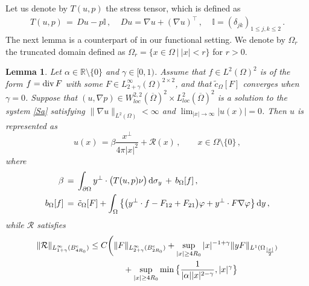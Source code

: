 \documentclass[11pt,a4paper]{article}
\newtheorem{lemma}[theorem]{Lemma}
\newcommand{\R}{\mathbb{R}}
\newcommand{\dd}{\,{\rm d}}
\begin{document}
Let us denote by $T(u,p)$ the stress tensor, which is defined as 
%
\begin{align}
T(u,p) \, = \, D u - p \mathbb{I}\,,~~~~~ D u = \nabla u + (\nabla u )^\top\,,~~~~~\mathbb{I} = (\delta_{j k})_{1\leq j,k\leq 2}\,.
\end{align}
%
The next lemma is a counterpart of \cite[Theorem 2.1]{H3} in our functional setting.
We denote by $\Omega_r$ the truncated domain defined as $\Omega_r = \{x\in \Omega~|~|x|<r\}$ for $r>0$. 



\begin{lemma}\label{lem.linear.exterior}
Let $\alpha \in \R \setminus \{0\}$ and $\gamma \in [0,1)$. Assume that  $f\in L^2 (\Omega)^2$ is of the form $f = {\rm div}\,F$ with some $F\in L^\infty_{2+\gamma} (\Omega)^{2\times 2}$, and that $\tilde c_\Omega [F]$ converges when $\gamma=0$.
Suppose that $(u, \nabla p)\in W^{2,2}_{loc} (\overline{\Omega})^2 \times L^2_{loc} (\overline{\Omega})^2$ is a solution to the system \eqref{Sa} satisfying  $\| \nabla u \|_{L^2 (\Omega)}<\infty$ and $\displaystyle \lim_{|x|\rightarrow \infty} |u (x)|=0$.
Then $u$ is represented as 
%
\begin{equation}\label{est.lem.linear.exterior.1}
u(x) \, = \beta \frac{x^{\bot}}{4\pi|x|^2} + \mathcal{R}(x)\,,  \qquad x\in \Omega\setminus \{0\}\,,
\end{equation}
%
where  
%
\begin{align}\label{est.lem.linear.exterior.3}
\begin{split}
\beta & \, = \,  \int_{\partial \Omega} y^\bot \cdot \big( T(u,p)\nu \big) \dd \sigma_{y} \,+\, b_\Omega [f]\,,\\
b_\Omega [f] & \, = \, \tilde c_\Omega [F] + \int_\Omega \big\{ \big ( y^\bot \cdot f  - F_{12} + F_{21} \big ) \varphi + y^\bot \cdot F \nabla \varphi  \big \} \dd y\,,
\end{split}
\end{align}
%
while $\mathcal{R}$ satisfies
%
\begin{align}
\begin{split}
\| \mathcal{R} \|_{L^{\infty}_{1+\gamma} (B^{{\rm c}}_{4R_{0}})}
& \le 
C \bigg ( 
\| F \|_{L^{\infty}_{2+\gamma} (B^{{\rm c}}_{2R_{0}})}
+ \sup_{|x|\geq 4 R_0} |x|^{-1 +\gamma} \| y F \|_{L^1 (\Omega_{ \frac{|x|}{2} })}  \\
&  \qquad \qquad 
+ \sup_{|x|\geq 4 R_0} \min \big \{ \frac{1}{|\alpha| |x|^{2-\gamma}}, |x|^\gamma \big \} 

\end{split}
\end{align}
\end{lemma}
\end{document}
